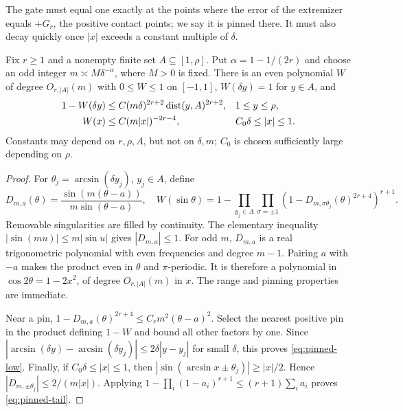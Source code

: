 The gate must equal one exactly at the points where the error of the extremizer equals $+G_r$, the positive contact points; we say it is pinned there. It must also decay quickly once $|x|$ exceeds a constant multiple of $\delta$.
\begin{lemma}\label{lem:pinned}
Fix $r\geq1$ and a nonempty finite set $A\subseteq[1,\rho]$. Put $\alpha=1-1/(2r)$ and choose an odd integer $m\asymp M\delta^{-\alpha}$, where $M>0$ is fixed. There is an even polynomial $W$ of degree $O_{r,|A|}(m)$ with $0\leq W\leq1$ on $[-1,1]$, $W(\delta y)=1$ for $y\in A$, and
\begin{align}
 1-W(\delta y)&\leq C(m\delta)^{2r+2}\operatorname{dist}(y,A)^{2r+2},
 &&1\leq y\leq\rho,\label{eq:pinned-low}\\
 W(x)&\leq C(m|x|)^{-2r-4},&& C_0\delta\leq|x|\leq1.\label{eq:pinned-tail}
\end{align}
Constants may depend on $r,\rho,A$, but not on $\delta,m$; $C_0$ is chosen sufficiently large depending on $\rho$.
\end{lemma}
\begin{proof}
For $\theta_j=\arcsin(\delta y_j)$, $y_j\in A$, define
\[
 D_{m,a}(\theta)=\frac{\sin(m(\theta-a))}{m\sin(\theta-a)},\quad
 W(\sin\theta)=1-
 \prod_{y_j\in A}\prod_{\sigma=\pm1}
 \left(1-D_{m,\sigma\theta_j}(\theta)^{2r+4}\right)^{r+1}.
\]
Removable singularities are filled by continuity. The elementary inequality $|\sin(mu)|\leq m|\sin u|$ gives $|D_{m,a}|\leq1$. For odd $m$, $D_{m,a}$ is a real trigonometric polynomial with even frequencies and degree $m-1$. Pairing $a$ with $-a$ makes the product even in $\theta$ and $\pi$-periodic. It is therefore a polynomial in $\cos2\theta=1-2x^2$, of degree $O_{r,|A|}(m)$ in $x$. The range and pinning properties are immediate.

Near a pin, $1-D_{m,a}(\theta)^{2r+4}\leq C_rm^2(\theta-a)^2$. Select the nearest positive pin in the product defining $1-W$ and bound all other factors by one. Since $|\arcsin(\delta y)-\arcsin(\delta y_j)|\leq2\delta|y-y_j|$ for small $\delta$, this proves \eqref{eq:pinned-low}. Finally, if $C_0\delta\leq|x|\leq1$, then $|\sin(\arcsin x\pm\theta_j)|\geq|x|/2$. Hence $|D_{m,\pm\theta_j}|\leq2/(m|x|)$. Applying $1-\prod_i(1-a_i)^{r+1}\leq(r+1)\sum_i a_i$ proves \eqref{eq:pinned-tail}.
\end{proof}


